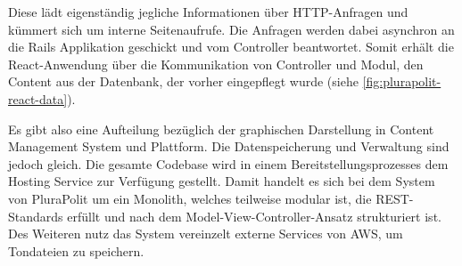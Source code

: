 Diese lädt eigenständig jegliche Informationen über HTTP-Anfragen und kümmert sich um interne Seitenaufrufe. Die Anfragen werden dabei asynchron an die Rails Applikation geschickt und vom Controller beantwortet. Somit erhält die React-Anwendung über die Kommunikation von Controller und Modul, den Content aus der Datenbank, der vorher eingepflegt wurde (siehe \cref{fig:plurapolit-react-data}).

Es gibt also eine Aufteilung bezüglich der graphischen Darstellung in Content Management System und Plattform. Die Datenspeicherung und Verwaltung sind jedoch gleich. Die gesamte Codebase wird in einem Bereitstellungsprozesses dem Hosting Service zur Verfügung gestellt. Damit handelt es sich bei dem System von PluraPolit um ein Monolith, welches teilweise modular ist, die REST-Standards erfüllt und nach dem Model-View-Controller-Ansatz strukturiert ist. Des Weiteren nutz das System vereinzelt externe Services von AWS, um Tondateien zu speichern.
